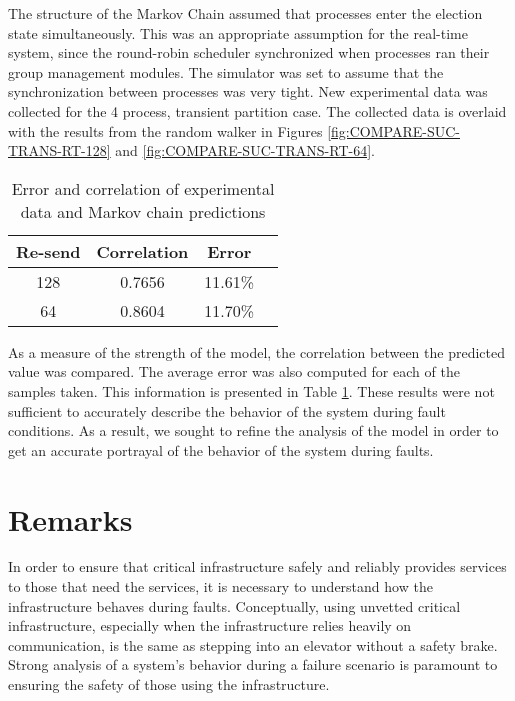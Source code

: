 The structure of the Markov Chain assumed that processes enter the election state simultaneously.
This was an appropriate assumption for the real-time system, since the round-robin scheduler synchronized when processes ran their group management modules.
The simulator was set to assume that the synchronization between processes was very tight.
New experimental data was collected for the 4 process, transient partition case.
The collected data is overlaid with the results from the random walker in Figures \ref{fig:COMPARE-SUC-TRANS-RT-128} and \ref{fig:COMPARE-SUC-TRANS-RT-64}.

\begin{table}
\caption{Error and correlation of experimental data and Markov chain predictions}
\label{tab:STAT-DATA}
\centering
\begin{tabular}{|c||c|c|c|}
\hline
Re-send & Correlation & Error \\ \hline
128 & 0.7656 & 11.61\% \\ \hline
64 & 0.8604 & 11.70\% \\ \hline
\end{tabular}
\end{table}

As a measure of the strength of the model, the correlation between the predicted value was compared.
The average error was also computed for each of the samples taken.
This information is presented in Table \ref{tab:STAT-DATA}.
These results were not sufficient to accurately describe the behavior of the system during fault conditions.
As a result, we sought to refine the analysis of the model in order to get an accurate portrayal of the behavior of the system during faults.

\section{Remarks}

In order to ensure that critical infrastructure safely and reliably provides services to those that need the services, it is necessary to understand how the infrastructure behaves during faults.
Conceptually, using unvetted critical infrastructure, especially when the infrastructure relies heavily on communication, is the same as stepping into an elevator without a safety brake.
Strong analysis of a system's behavior during a failure scenario is paramount to ensuring the safety of those using the infrastructure.


